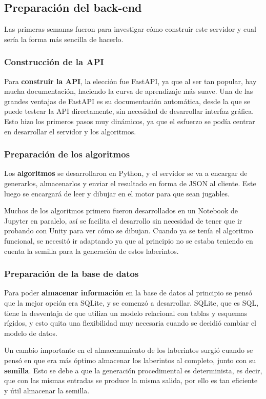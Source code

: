 \subsection{Preparación del back-end}
Las primeras semanas fueron para investigar cómo construir este servidor y cual sería la forma más sencilla de hacerlo. 
\subsubsection{Construcción de la API}
Para \textbf{construir la API}, la elección fue FastAPI, ya que al ser tan popular, hay mucha documentación, haciendo la curva de aprendizaje más suave. Una de las grandes ventajas de FastAPI es su documentación automática, desde la que se puede testear la API directamente, sin necesidad de desarrollar interfaz gráfica. Esto hizo los primeros pasos muy dinámicos, ya que el esfuerzo se podía centrar en desarrollar el servidor y los algoritmos.

\subsubsection{Preparación de los algoritmos}
Los \textbf{algoritmos} se desarrollaron en Python, y el servidor se va a encargar de generarlos, almacenarlos y enviar el resultado en forma de JSON al cliente. Este luego se encargará de leer y dibujar en el motor para que sean jugables. 

Muchos de los algoritmos primero fueron desarrollados en un Notebook de Jupyter en paralelo, así se facilita el desarrollo sin necesidad de tener que ir probando con Unity para ver cómo se dibujan. Cuando ya se tenía el algoritmo funcional, se necesitó ir adaptando ya que al principio no se estaba teniendo en cuenta la semilla para la generación de estos laberintos.

\subsubsection{Preparación de la base de datos}

Para poder \textbf{almacenar información} en la base de datos al principio se pensó que la mejor opción era SQLite, y se comenzó a desarrollar. 
SQLite, que es SQL, tiene la desventaja de que utiliza un modelo relacional con tablas y esquemas rígidos, y esto quita una flexibilidad muy necesaria cuando se decidió cambiar el modelo de datos. 

Un cambio importante en el almacenamiento de los laberintos surgió cuando se pensó en que era más óptimo almacenar los laberintos al completo, junto con su \textbf{semilla}. Esto se debe a que la generación procedimental es determinista, es decir, que con las mismas entradas se produce la misma salida, por ello es tan eficiente y útil almacenar la semilla.


